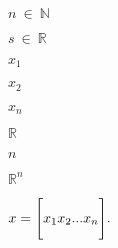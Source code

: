 \documentclass[UTF8]{ctexart}
\begin{document}
$n\ \in\ \mathbb{N}$


$s\ \in\ \mathbb{R}$

$x_1$


$x_2$

$x_n$


$\mathbb{R}$

$n$

$\mathbb{R}^n$

$
x = \Bigg[ x_1 \\x_2 ... x_n \Bigg].
$
\end{document}
